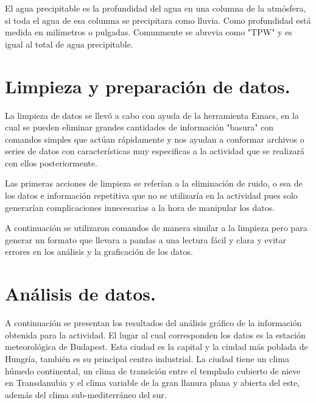 \documentclass{article} %
\begin{document}
\vspace{0.5 cm}

El agua precipitable es la profundidad del agua en una columna de la atmósfera, si toda el agua de esa columna se precipitara como lluvia. Como profundidad está medida en milímetros o pulgadas. Comunmente se abrevia como "TPW" y es igual al total de agua precipitable. 


\section{Limpieza y preparación de datos.}

La limpieza de datos se llevó a cabo con ayuda de la herramienta Emacs, en la cual se pueden eliminar grandes cantidades de información "basura" con comandos simples que actúan rápidamente y nos ayudan a conformar archivos o series de datos con características muy especificas a la actividad que se realizará con ellos posteriormente. 	

\vspace{0.5 cm}

Las primeras acciones de limpieza se referían a la eliminación de ruido, o sea de los datos e información repetitiva que no se utilizaría en la actividad pues solo generarían complicaciones innecesarias a la hora de manipular los datos. 

\vspace{0.5 cm}

A continuación se utilizaron comandos de manera similar a la limpieza pero para generar un formato que llevara a pandas a una lectura fácil y clara y evitar errores en los análisis y la graficación de los datos. 

\section{Análisis de datos.}

A continuación se presentan los resultados del análisis gráfico de la información obtenida para la actividad. El lugar al cual corresponden los datos es la estación meteorológica de Budapest. Esta ciudad es la capital y la ciudad más poblada de Hungría, también es su principal centro industrial. La ciudad tiene un clima húmedo continental, un clima de transición entre el templado cubierto de nieve en Transdanubia y el clima variable de la gran llanura plana y abierta del este, además del clima sub-mediterráneo del sur. 

\vspace{0.5 cm}
\end{document}
